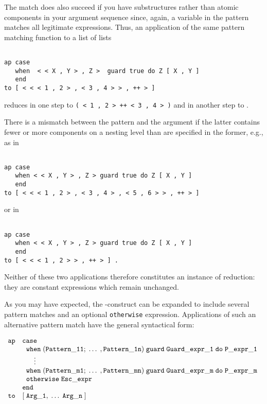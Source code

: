 The match does also succeed if you have substructures rather than atomic components
in your argument sequence since, again, a variable in the pattern matches all legitimate 
\kir expressions. Thus, an application of the same pattern matching function to a list
of lists 
\begin{verbatim}

ap case 
   when  < < X , Y > , Z >  guard true do Z [ X , Y ]
   end
to [ < < < 1 , 2 > , < 3 , 4 > > , ++ > ]

\end{verbatim}
reduces in one step to {\tt ( < 1 , 2 > ++ < 3 , 4 > )} and in another step to
{\tt < 1 , 2 , 3 , 4 >}.

There is a mismatch between the pattern and the argument if the latter contains fewer
or more components on a nesting level than are specified in the former, e.g., as in
\begin{verbatim}

ap case 
   when < < X , Y > , Z > guard true do Z [ X , Y ]
   end
to [ < < < 1 , 2 > , < 3 , 4 > , < 5 , 6 > > , ++ > ]

\end{verbatim}
 or in
\begin{verbatim}

ap case 
   when < < X , Y > , Z > guard true do Z [ X , Y ]
   end
to [ < < < 1 , 2 > > , ++ > ] .

\end{verbatim}
Neither of these two applications therefore constitutes an instance of reduction:
they are constant expressions which remain unchanged.

As you may have expected, the {-construct} can be expanded to
include several pattern matches and an optional {\tt otherwise} expression.
Applications of such an {\mys alternative pattern match} have the general syntactical form: 

$$
\begin{array}{ll}
{\tt ap}&{\tt case}\;
\\  & \;\;{\tt when\;(Pattern\_11;\;\ldots\;,Pattern\_1n)\;guard\;Guard\_expr\_1\;do\;P\_expr\_1}\;
\\ & \;\;\;\;\;\;\vdots
\\  & \;\;{\tt when\;(Pattern\_m1;\;\ldots\;,Pattern\_mn)\;guard\;Guard\_expr\_m\;do\;P\_expr\_m}\;
\\ & \;\;{\tt otherwise \; Esc\_expr}
\\ & {\tt end}
\\ {\tt to}& {\tt [\;Arg\_1, \;\ldots\;Arg\_n\;]}
\end{array}
$$
 
